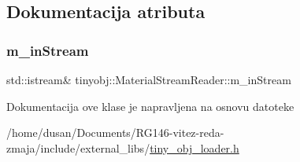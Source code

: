 \subsection{Dokumentacija atributa}
\mbox{\label{classtinyobj_1_1MaterialStreamReader_a8de39704770b77d36d6cebe09d941435}} 
\subsubsection{\texorpdfstring{m\+\_\+in\+Stream}{m\_inStream}}
{\footnotesize\ttfamily std\+::istream\& tinyobj\+::\+Material\+Stream\+Reader\+::m\+\_\+in\+Stream\hspace{0.3cm}{\ttfamily [private]}}



Dokumentacija ove klase je napravljena na osnovu datoteke \begin{DoxyCompactItemize}
\item 
/home/dusan/\+Documents/\+R\+G146-\/vitez-\/reda-\/zmaja/include/external\+\_\+libs/\hyperlink{tiny__obj__loader_8h}{tiny\+\_\+obj\+\_\+loader.\+h}\end{DoxyCompactItemize}
